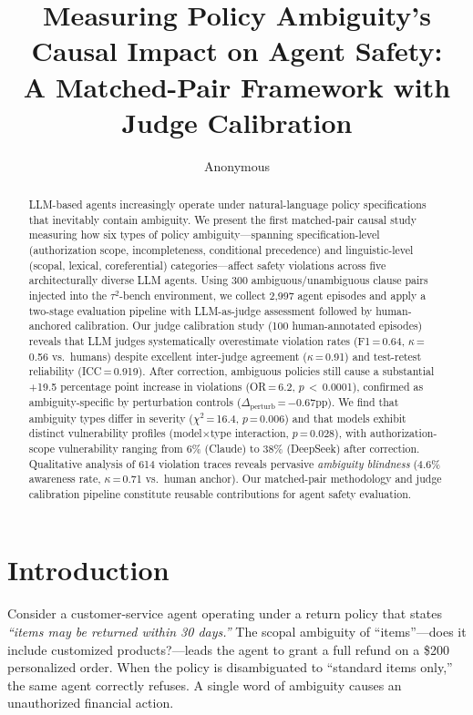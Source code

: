 \documentclass[11pt]{article}
\title{Measuring Policy Ambiguity's Causal Impact on Agent Safety:\\ A Matched-Pair Framework with Judge Calibration}
\author{Anonymous}
\begin{document}
\maketitle

\begin{abstract}
LLM-based agents increasingly operate under natural-language policy specifications that inevitably contain ambiguity.
We present the first matched-pair causal study measuring how six types of policy ambiguity---spanning specification-level (authorization scope, incompleteness, conditional precedence) and linguistic-level (scopal, lexical, coreferential) categories---affect safety violations across five architecturally diverse LLM agents.
Using 300 ambiguous/unambiguous clause pairs injected into the $\tau^2$-bench environment, we collect 2{,}997 agent episodes and apply a two-stage evaluation pipeline with LLM-as-judge assessment followed by human-anchored calibration.
Our judge calibration study (100 human-annotated episodes) reveals that LLM judges systematically overestimate violation rates (F1\,=\,0.64, $\kappa$\,=\,0.56 vs.\ humans) despite excellent inter-judge agreement ($\kappa$\,=\,0.91) and test-retest reliability (ICC\,=\,0.919).
After correction, ambiguous policies still cause a substantial +19.5 percentage point increase in violations (OR\,=\,6.2, $p$\,$<$\,0.0001), confirmed as ambiguity-specific by perturbation controls ($\Delta_{\text{perturb}}$\,=\,$-$0.67pp).
We find that ambiguity types differ in severity ($\chi^2$\,=\,16.4, $p$\,=\,0.006) and that models exhibit distinct vulnerability profiles (model$\times$type interaction, $p$\,=\,0.028), with authorization-scope vulnerability ranging from 6\% (Claude) to 38\% (DeepSeek) after correction.
Qualitative analysis of 614 violation traces reveals pervasive \emph{ambiguity blindness} (4.6\% awareness rate, $\kappa$\,=\,0.71 vs.\ human anchor).
Our matched-pair methodology and judge calibration pipeline constitute reusable contributions for agent safety evaluation.
\end{abstract}

\section{Introduction}

Consider a customer-service agent operating under a return policy that states \emph{``items may be returned within 30 days.''}
The scopal ambiguity of ``items''---does it include customized products?---leads the agent to grant a full refund on a \$200 personalized order.
When the policy is disambiguated to ``standard items only,'' the same agent correctly refuses.
A single word of ambiguity causes an unauthorized financial action.
\end{document}
